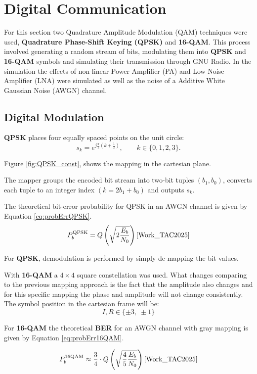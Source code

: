 
\section{Digital Communication}

For this section two Quadrature Amplitude Modulation (QAM) techniques were used, \textbf{Quadrature Phase-Shift Keying (QPSK)} and \textbf{16-QAM}. This process involved generating a random stream of bits, modulating them into \textbf{QPSK} and \textbf{16-QAM} symbols and simulating their transmission through GNU Radio. In the simulation the effects of non-linear Power Amplifier (PA) and Low Noise Amplifier (LNA) were simulated as well as the noise of a Additive White Gaussian Noise (AWGN) channel.

\subsection{Digital Modulation}

\label{ssec:modulations}
\textbf{QPSK} places four equally spaced points on the unit circle:
\[
s_k = e^{j\frac{\pi}{2}\left(k+\tfrac12\right)}, \qquad k\in\{0,1,2,3\}.
\]

Figure \ref{fig:QPSK_const}, shows the mapping in the cartesian plane.


The mapper groups the encoded bit stream into two-bit tuples $(b_1,b_0)$, converts each tuple to an integer index $(k =2b_1+b_0)$ and outputs \(s_k\).

The theoretical bit-error probability for QPSK in an AWGN channel is given by Equation \ref{eq:probErrQPSK}.
\begin{equation}
  P_b^{\text{QPSK}} = Q\left(\sqrt{2\frac{E_b}{N_0}}\right)\text{\cite{Work_TAC2025}}
  \label{eq:probErrQPSK}
\end{equation}

For \textbf{QPSK}, demodulation is performed by simply de-mapping the bit values.


With \textbf{16-QAM} a $4\times4$ square constellation was used. What changes comparing to the previous mapping approach is the fact that the amplitude also changes and for this specific mapping the phase and amplitude will not change consistently. The symbol position in the cartesian frame will be:
\[
I,R \in \{\pm3,\;\pm1\}
\]

For \textbf{16-QAM} the theoretical \textbf{BER} for an AWGN channel with gray mapping is given by Equation \ref{eq:probErr16QAM}.

\begin{equation}
  P_b^{\text{16QAM}} \approx \frac{3}{4}\cdot Q\left(\sqrt{\frac{4}{5}\frac{E_b}{N_0}}\right)\text{\cite{Work_TAC2025}}
  \label{eq:probErr16QAM}
\end{equation}


